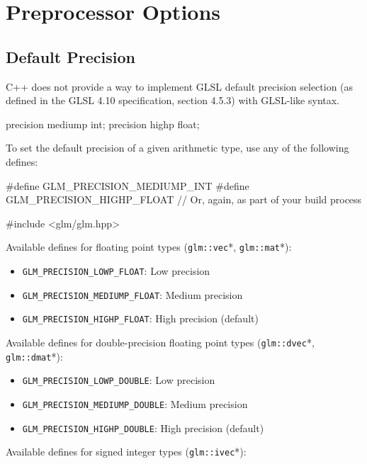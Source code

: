 \documentclass{scrartcl}
\numberwithin{figure}{subsection}
\begin{document}
\newpage{}

\section{Preprocessor Options}

\subsection{Default Precision}
\label{Default Precision}
C++ does not provide a way to implement GLSL default precision selection (as defined in the GLSL 4.10 specification, section 4.5.3) with GLSL-like syntax.

\begin{glslcode}
precision mediump int;
precision highp float;
\end{glslcode}

To set the default precision of a given arithmetic type, use any of the following defines:

\begin{cppcode}
#define GLM_PRECISION_MEDIUMP_INT
#define GLM_PRECISION_HIGHP_FLOAT
// Or, again, as part of your build process

#include <glm/glm.hpp>
\end{cppcode}

Available defines for floating point types (\verb|glm::vec|*, \verb|glm::mat|*):

\begin{itemize}
    \item \verb|GLM_PRECISION_LOWP_FLOAT|: Low precision
    \item \verb|GLM_PRECISION_MEDIUMP_FLOAT|: Medium precision 
    \item \verb|GLM_PRECISION_HIGHP_FLOAT|: High precision (default)
\end{itemize}

Available defines for double-precision floating point types (\verb|glm::dvec|*, \verb|glm::dmat|*):

\begin{itemize}
    \item \verb|GLM_PRECISION_LOWP_DOUBLE|: Low precision
    \item \verb|GLM_PRECISION_MEDIUMP_DOUBLE|: Medium precision 
    \item \verb|GLM_PRECISION_HIGHP_DOUBLE|: High precision (default)
\end{itemize}

Available defines for signed integer types (\verb|glm::ivec|*):
\end{document}
